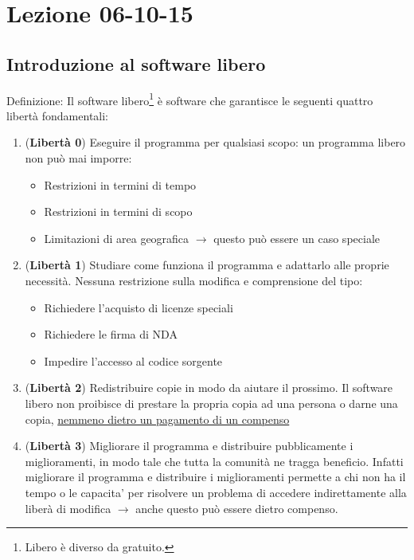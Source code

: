 \section{Lezione 06-10-15}

\subsection{Introduzione al software libero}

Definizione: Il software libero\footnote{Libero \`e diverso da gratuito.} \`e software che garantisce le seguenti quattro libert\`a fondamentali:

\begin{enumerate}

\item (\textbf{Libertà 0}) Eseguire il programma per qualsiasi scopo: un programma libero non pu\`o mai imporre:

  \begin{itemize}

  \item Restrizioni in termini di tempo
  \item Restrizioni in termini di scopo
  \item Limitazioni di area geografica $\to$ questo pu\`o essere un caso speciale

  \end{itemize}

\item (\textbf{Libertà 1}) Studiare come funziona il programma e adattarlo alle proprie necessit\`a.
Nessuna restrizione sulla modifica e comprensione del tipo:

  \begin{itemize}

  \item Richiedere l'acquisto di licenze speciali
  \item Richiedere le firma di NDA
  \item Impedire l'accesso al codice sorgente

  \end{itemize}

\item (\textbf{Libertà 2}) Redistribuire copie in modo da aiutare il prossimo. Il software libero non proibisce di prestare la propria copia ad una persona o darne una copia, \underline{nemmeno dietro un pagamento di un compenso}

  \item (\textbf{Libertà 3}) Migliorare il programma e distribuire pubblicamente i miglioramenti, in modo tale che tutta la comunit\`a ne tragga beneficio. Infatti migliorare il programma e distribuire i miglioramenti permette a chi non ha il tempo o le capacita' per risolvere un problema di accedere indirettamente alla liber\`a di modifica $\to$ anche questo pu\`o essere dietro compenso.

\end{enumerate}

